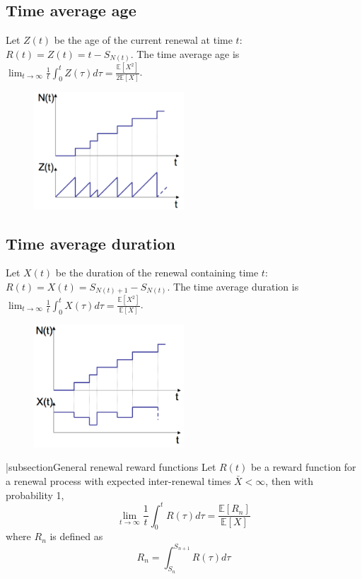 \documentclass[12pt, openany]{report}
\newcommand{\E}{\mathbb{E}}
\theoremstyle{definition}
\begin{document}
\subsection{Time average age}
Let $Z(t)$ be the age of the current renewal at time $t$: $R(t)=Z(t)=t-S_{N(t)}$. The time average age is $\lim_{t\to \infty} \frac{1}{t}\int_0^t Z(\tau)d\tau= \frac{\E[X^2]}{2\E[X]}$.\\
\begin{figure}[H]
	\centering
	\includegraphics[width=0.5\textwidth]{img/age.png}
\end{figure}
\subsection{Time average duration}
Let $X(t)$ be the duration of the renewal containing time $t$: $R(t)=X(t)=S_{N(t)+1}-S_{N(t)}$. The time average duration is $\lim_{t\to \infty} \frac{1}{t}\int_0^t X(\tau)d\tau = \frac{\E[X^2]}{\E[X]}$.\\
\begin{figure}[H]
	\centering
	\includegraphics[width=0.5\textwidth]{img/duration.png}
\end{figure}
|subsection{General renewal reward functions}
Let $R(t)$ be a reward function for a renewal process with expected inter-renewal times $\bar X<\infty$, then with probability 1, 
\begin{equation}
	\lim_{t\to \infty} \frac{1}{t}\int_0^t R(\tau)d\tau = \frac{\E[R_n]}{\E[X]}
\end{equation}
where $R_n$ is defined as 
\begin{equation}
	R_n = \int_{S_n}^{S_{n+1}} R(\tau)d\tau
\end{equation}
\end{document}
